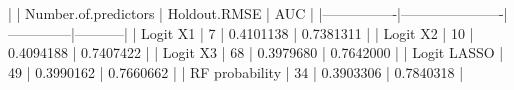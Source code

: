 |                | Number.of.predictors | Holdout.RMSE |    AUC    | |----------------|----------------------|--------------|-----------| |    Logit X1    |          7           |  0.4101138   | 0.7381311 | |    Logit X2    |          10          |  0.4094188   | 0.7407422 | |    Logit X3    |          68          |  0.3979680   | 0.7642000 | |  Logit LASSO   |          49          |  0.3990162   | 0.7660662 | | RF probability |          34          |  0.3903306   | 0.7840318 |